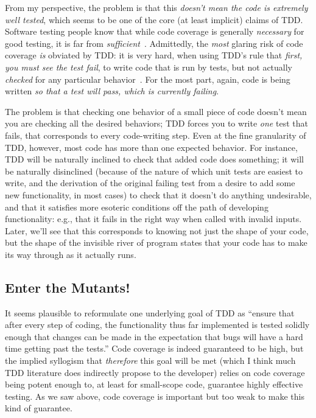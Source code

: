 \documentclass[sigplan,screen]{acmart}
\begin{document}
From my perspective, the problem is that this \emph{doesn't mean the
  code is extremely well tested}, which seems to be one of the core
(at least implicit) claims of TDD.  Software testing people know that
while code coverage is generally \emph{necessary} for good testing, it
is far from \emph{sufficient}~\cite{Discontents,CleanCode}.  Admittedly, the \emph{most} glaring risk of code
coverage \emph{is} obviated by TDD:  it is very hard, when using TDD's
rule that \emph{first, you must see the test fail}, to write code
that is run by tests, but not actually \emph{checked} for any
particular behavior~\cite{Schuler2011AssessingOQ}.  For the most part,
again, code is being written \emph{so that a test will pass, which is
  currently failing}.

The problem is that checking one behavior of a small piece of code
doesn't mean you are checking all the desired behaviors; TDD forces
you to write \emph{one} test that fails, that corresponds to every
code-writing step.  Even at the fine granularity of TDD, however, most
code has more than one expected behavior.  For instance, TDD will be
naturally inclined to check that added code does something; it will be
naturally disinclined (because of the nature of which unit tests are
easiest to write, and the
derivation of the original failing test from a desire to add some new
functionality, in most cases) to check that it doesn't do anything
undesirable, and that it satisfies more esoteric conditions off the
path of developing functionality: e.g., that it fails in the right way when called with
invalid inputs.  Later, we'll see that this corresponds to knowing not
just the shape of your code, but the shape of the invisible river of program
states that your code has to make its way through as it actually runs.

\subsection{Enter the Mutants!}

It seems plausible to reformulate one underlying goal of TDD as
``ensure that after every step of coding, the functionality thus far
implemented is tested solidly enough that changes can be made in the
expectation that bugs will have a hard time getting past the tests.''
Code coverage is indeed guaranteed to be high, but the implied syllogism that
\emph{therefore} this goal will be met (which I think much TDD
literature does indirectly propose to the developer) relies on code coverage being potent
enough to, at least for small-scope code, guarantee highly effective
testing.  As we saw above, code coverage is important but too weak to
make this kind of guarantee.
\end{document}
